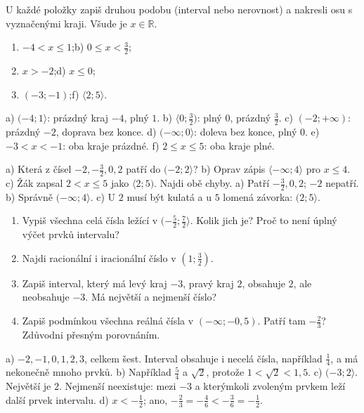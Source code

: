 \documentclass[11pt,a4paper]{article}
\begin{document}
\begin{zadaniReseniBox}[title={Samostatná práce 1},breakable=false]
U každé položky zapiš druhou podobu (interval nebo nerovnost)
a nakresli osu s vyznačenými kraji. Všude je $x\in\mathbb R$.
\begin{enumerate}[label=\alph*)]
\item $-4<x\le1$;\quad b) $0\le x<\frac32$;
\item[c)] $x>-2$;\quad d) $x\le0$;
\item[e)] $(-3;-1)$;\quad f) $\langle2;5\rangle$.
\end{enumerate}
\tcblower
a) $(-4;1\rangle$: prázdný kraj $-4$, plný $1$.
b) $\langle0;\frac32)$: plný $0$, prázdný $\frac32$.
c) $(-2;+\infty)$: prázdný $-2$, doprava bez konce.
d) $(-\infty;0\rangle$: doleva bez konce, plný $0$.
e) $-3<x<-1$: oba kraje prázdné.
f) $2\le x\le5$: oba kraje plné.
\end{zadaniReseniBox}

\begin{zadaniReseniBox}[title={Samostatná práce 2},breakable=false]
a) Která z čísel $-2,-\frac32,0,2$ patří do $(-2;2\rangle$?
b) Oprav zápis $\langle-\infty;4\rangle$ pro $x\le4$.
c) Žák zapsal $2<x\le5$ jako $\langle2;5)$. Najdi obě chyby.
\tcblower
a) Patří $-\frac32,0,2$; $-2$ nepatří.
b) Správně $(-\infty;4\rangle$.
c) U $2$ musí být kulatá a u $5$ lomená závorka: $(2;5\rangle$.
\end{zadaniReseniBox}


\newpage
{}
\begin{zadaniReseniBox}[title={Rozšíření 1},breakable=false]
\begin{enumerate}[label=\alph*)]
\item Vypiš všechna celá čísla ležící v $(-\frac52;\frac72\rangle$.
Kolik jich je? Proč to není úplný výčet prvků intervalu?
\item Najdi racionální i iracionální číslo v $(1;\frac32)$.
\item Zapiš interval, který má levý kraj $-3$, pravý kraj $2$,
obsahuje $2$, ale neobsahuje $-3$. Má největší a nejmenší číslo?
\item Zapiš podmínkou všechna reálná čísla v $(-\infty;-0{,}5)$.
Patří tam $-\frac23$? Zdůvodni přesným porovnáním.
\end{enumerate}
\tcblower
a) $-2,-1,0,1,2,3$, celkem šest. Interval obsahuje i necelá čísla,
například $\frac14$, a má nekonečně mnoho prvků.
b) Například $\frac54$ a $\sqrt2$, protože $1<\sqrt2<1{,}5$.
c) $(-3;2\rangle$. Největší je $2$. Nejmenší neexistuje:
mezi $-3$ a kterýmkoli zvoleným prvkem leží další prvek intervalu.
d) $x<-\frac12$; ano, $-\frac23=-\frac46<-\frac36=-\frac12$.
\end{zadaniReseniBox}
\end{document}

